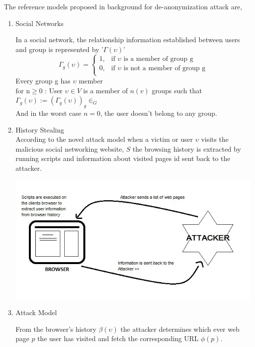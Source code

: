 \documentclass{article}
\begin{document}
The reference models proposed in background for de-anonymization attack are,\\
\begin{enumerate}
\item Social Networks

	In a social network, the relationship information established between users and group is represented by '$\Gamma(\upsilon)$'\\
\begin{equation*}	
\Gamma_g(\upsilon)=
\begin{cases}
1, & \text{if } \upsilon \text{ is a member of group g}\\
0, & \text{if } \upsilon \text{ is not a member of group g}\\
\end{cases}
\end{equation*}
Every group g has $\upsilon$ member\\
$\text{for n}\geq0$ : User $\upsilon \in {V}$ is a member of $n(v)$ groups such that \\
$\Gamma_g(\upsilon):=(\Gamma_g(\upsilon))_g \in _G $\\
And in the worst case $n=0$, the user doesn't belong to any group.\\

\item History Stealing\\
	According to the novel attack model when a victim or user $\upsilon$ visits the malicious social networking website, $S$ the browsing history is extracted by running scripts and information about visited pages id sent back to the attacker.

\includegraphics[scale=0.5]{History Stealing.jpg}
	
\item Attack Model

	From the browser's history $\beta(\upsilon)$ the attacker determines which ever web page $p$ the user has visited and fetch the corresponding URL $\phi(p)$.	
	

\end{enumerate}
\end{document}

